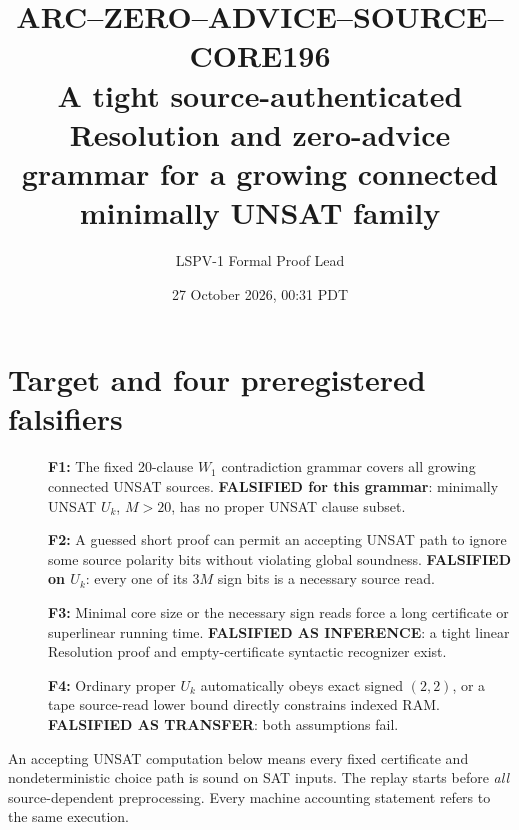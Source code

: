 \documentclass[11pt]{article}
\title{ARC--ZERO--ADVICE--SOURCE--CORE196\\A tight source-authenticated Resolution and zero-advice grammar for a growing connected minimally UNSAT family}
\author{LSPV-1 Formal Proof Lead}
\date{27 October 2026, 00:31 PDT}
\begin{document}
\maketitle
\begin{center}
\end{center}
\section{Target and four preregistered falsifiers}
\begin{description}
\item[]\textbf{F1:} The fixed 20-clause \(W_1\) contradiction grammar covers all growing connected UNSAT sources.
\textbf{FALSIFIED for this grammar}: minimally UNSAT \(U_k\), \(M>20\), has no proper UNSAT clause subset.
\item[]\textbf{F2:} A guessed short proof can permit an accepting UNSAT path to ignore some source polarity bits without violating global soundness.
\textbf{FALSIFIED on \(U_k\)}: every one of its \(3M\) sign bits is a necessary source read.
\item[]\textbf{F3:} Minimal core size or the necessary sign reads force a long certificate or superlinear running time.
\textbf{FALSIFIED AS INFERENCE}: a tight linear Resolution proof and empty-certificate syntactic recognizer exist.
\item[]\textbf{F4:} Ordinary proper \(U_k\) automatically obeys exact signed \((2,2)\), or a tape source-read lower bound directly constrains indexed RAM.
\textbf{FALSIFIED AS TRANSFER}: both assumptions fail.
\end{description}
An accepting UNSAT computation below means every fixed certificate and nondeterministic choice path is sound on SAT inputs. The replay starts before \emph{all} source-dependent preprocessing. Every machine accounting statement refers to the same execution.
\end{document}
